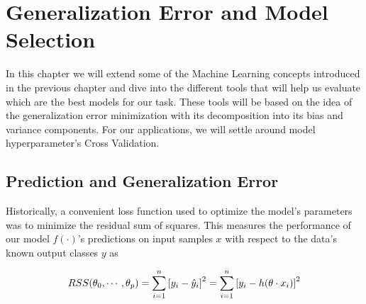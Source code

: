 
\chapter{Generalization Error and Model Selection }\label{ch:modelSelection}


In this chapter we will extend some of the Machine Learning concepts introduced in the previous chapter and dive into the different tools that will help us evaluate which are the best models for our task.
These tools will be based on the idea of the generalization error minimization with its decomposition into its bias and variance components.
For our applications, we will settle around model hyperparameter's Cross Validation.


\section{Prediction and Generalization Error}\label{subsection-generalizationError}

Historically, a convenient loss function used to optimize the model's parameters was to minimize the residual sum of squares.
This measures the performance of our model $f(\cdot)$'s predictions on input samples $x$ with respect to the data's known output classes $y$ as

\begin{equation}
RSS(\theta_0,\cdots ,\theta_p) = \sum_{i=1}^n {[y_i - \hat{y}_i ] }^2 \\
= \sum_{i=1}^n  {[y_i - h( \theta \cdot x_i)] }^2
\label{eq:rss}
\end{equation}


